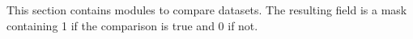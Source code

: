 This section contains modules to compare datasets.
The resulting field is a mask containing 1 if the comparison is true
and 0 if not.
